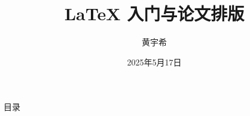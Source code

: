 \documentclass[handout]{ctexbeamer}
\title{\LaTeX{} 入门与论文排版}
\author{黄宇希}
\institute[HLUG]{华中科技大学Linux协会(HLUG)}
\date{2025年5月17日}
\begin{document}
\begin{frame}[plain]
  \titlepage
\end{frame}

\begin{frame}[plain]{目录}
  \tableofcontents
\end{frame}






\end{document}
